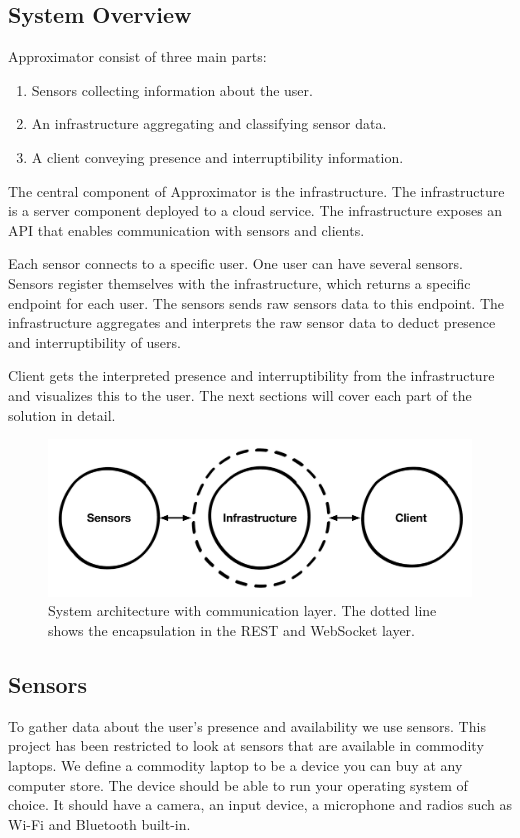 \documentclass{sigchi}
\begin{document}
\subsection{System Overview}
Approximator consist of three main parts:
\begin{enumerate}
  \item Sensors collecting information about the user.
  \item An infrastructure aggregating and classifying sensor data.
  \item A client conveying presence and interruptibility information.
\end{enumerate}

The central component of Approximator is the infrastructure.
The infrastructure is a server component deployed to a cloud service.
The infrastructure exposes an API that enables communication with sensors and clients.

Each sensor connects to a specific user.
One user can have several sensors.
Sensors register themselves with the infrastructure, which returns a specific endpoint for each user.
The sensors sends raw sensors data to this endpoint.
The infrastructure aggregates and interprets the raw sensor data to deduct presence and interruptibility of users.

Client gets the interpreted presence and interruptibility from the infrastructure and visualizes this to the user.
The next sections will cover each part of the solution in detail.

\begin{figure}[H]
  \centering
  \includegraphics[width=\columnwidth]{figures/system_architecture.pdf}
  \caption{System architecture with communication layer. The dotted line shows the encapsulation in the REST and WebSocket layer.}
  \label{fig:architecture}
\end{figure}

\subsection{Sensors}
To gather data about the user's presence and availability we use sensors.
This project has been restricted to look at sensors that are available in commodity laptops.
We define a commodity laptop to be a device you can buy at any computer store.
The device should be able to run your operating system of choice.
It should have a camera, an input device, a microphone and radios such as Wi-Fi and Bluetooth built-in.
\end{document}
